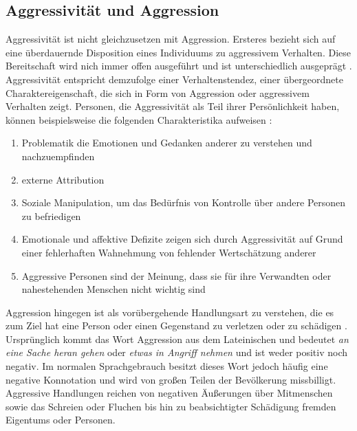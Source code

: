 \subsection{Aggressivität und Aggression}    \label{subsec_2.1.1}

Aggressivität ist nicht gleichzusetzen mit Aggression. Ersteres bezieht sich auf eine überdauernde Disposition eines Individuums zu aggressivem Verhalten. Diese Bereitschaft wird nich immer offen ausgeführt und ist unterschiedlich ausgeprägt
\parencite{Def_unterscheidung_Springer, Def_Aggressivität_Duden, Def_Aggressivität_Spektrum}. Aggressivität entspricht demzufolge einer Verhaltenstendez, einer übergeordnete Charaktereigenschaft, die sich in Form von Aggression oder aggressivem Verhalten zeigt. Personen, die Aggressivität als Teil ihrer Persönlichkeit haben, können beispielsweise die folgenden Charakteristika aufweisen \parencite{Def_Aggressivität_eng1}:
\begin{enumerate} [leftmargin=1.25cm] 
      \item Problematik die Emotionen und Gedanken anderer zu verstehen und nachzuempfinden
      \item externe Attribution
      \item Soziale Manipulation, um das Bedürfnis von Kontrolle über andere 
            Personen zu befriedigen
      \item Emotionale und affektive Defizite zeigen sich durch Aggressivität auf Grund einer fehlerhaften Wahnehmung von fehlender Wertschätzung anderer
      \item Aggressive Personen sind der Meinung, dass sie für ihre Verwandten oder nahestehenden Menschen nicht wichtig sind
\end{enumerate}

Aggression hingegen ist als vorübergehende Handlungsart zu verstehen, die es zum Ziel hat eine Person oder einen Gegenstand zu verletzen oder zu schädigen
\parencite{Def_Aggression_1939, Def_unterscheidung_Springer, Def_Aggression_Duden}.
Ursprünglich kommt das Wort Aggression aus dem Lateinischen und bedeutet 
\textit{an eine Sache heran gehen} oder \textit{etwas in Angriff nehmen} \parencite{was_Aggression} und ist weder positiv noch negativ. Im normalen Sprachgebrauch besitzt dieses Wort jedoch häufig eine negative Konnotation und wird von großen Teilen der Bevölkerung missbilligt. Aggressive Handlungen reichen von negativen Äußerungen über Mitmenschen sowie das Schreien oder Fluchen bis hin zu beabsichtigter Schädigung fremden Eigentums oder Personen. 


